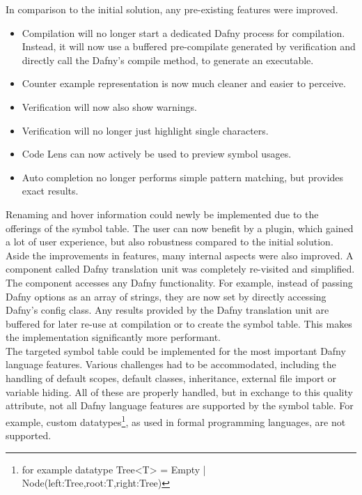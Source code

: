 In comparison to the initial solution, any pre-existing features were improved.

\begin{itemize}
 \item Compilation will no longer start a dedicated Dafny process for compilation. Instead, it will now use a buffered pre-compilate generated by verification and directly call the Dafny's compile method, to generate an executable.
 \item Counter example representation is now much cleaner and easier to perceive.
 \item Verification will now also show warnings.
 \item Verification will no longer just highlight single characters.
 \item Code Lens can now actively be used to preview symbol usages.
 \item Auto completion no longer performs simple pattern matching, but provides exact results.
\end{itemize}
Renaming and hover information could newly be implemented due to the offerings of the symbol table.
The user can now benefit by a plugin, which gained a lot of user experience, but also robustness compared to the initial solution.\\

Aside the improvements in features, many internal aspects were also improved.
A component called Dafny translation unit was completely re-visited and simplified.
The component accesses any Dafny functionality.
For example, instead of passing Dafny options as an array of strings, they are now set by
directly accessing Dafny's config class.
Any results provided by the Dafny translation unit are buffered for later re-use at compilation or to create the symbol table.
This makes the implementation significantly more performant.\\

The targeted symbol table could be implemented for the most important Dafny language features.
Various challenges had to be accommodated, including the handling of default scopes, default classes, inheritance, external file import or variable hiding.
All of these are properly handled, but in exchange to this quality attribute, not all Dafny language features are supported by the symbol table.
For example, custom datatypes\footnote{for example datatype Tree<T> = Empty | Node(left:Tree,root:T,right:Tree)}, as used in formal programming languages, are not supported.\\

